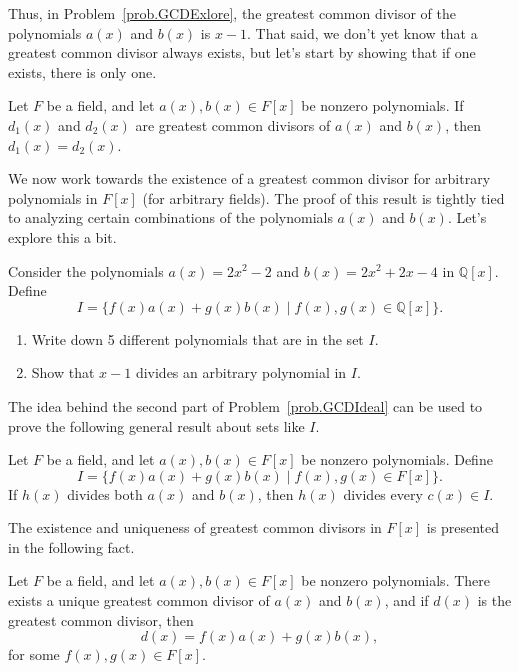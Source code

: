 Thus, in Problem~\ref{prob.GCDExlore},  the greatest common divisor of the polynomials $a(x)$ and $b(x)$ is $x-1$.
That said, we don't yet know that a greatest common divisor always exists, but let's start by showing that if one exists, there is only one.

\begin{lemma}\label{lem.GCDUnique}
Let $F$ be a field, and let $a(x), b(x)\in F[x]$ be nonzero polynomials. If $d_1(x)$ and $d_2(x)$ are  greatest common divisors of $a(x)$ and $b(x)$, then $d_1(x)=d_2(x)$.
\end{lemma}

We now work towards the existence of a greatest common divisor for arbitrary polynomials in $F[x]$ (for arbitrary fields). The proof of this result is tightly tied to analyzing certain combinations of the polynomials $a(x)$ and $b(x)$. Let's explore this a bit.

\begin{problem}\label{prob.GCDIdeal}
Consider the polynomials $a(x) = 2x^2-2$ and $b(x) = 2x^2+2x-4$ in $\mathbb{Q}[x]$.  Define \[I = \{f(x)a(x) + g(x)b(x)\mid f(x),g(x)\in \mathbb{Q}[x]\}.\]
\begin{enumerate}
\item Write down 5 different polynomials that are in the set $I$. 
\item Show that $x-1$ divides an arbitrary polynomial in $I$.
\end{enumerate}
\end{problem}

The idea behind the second part of Problem~\ref{prob.GCDIdeal} can be used to prove the following general result about sets like $I$.

\begin{theorem}\label{thm.HalfOfGCDProof}
Let $F$ be a field, and let $a(x), b(x)\in F[x]$ be nonzero polynomials. Define \[I = \{f(x)a(x) + g(x)b(x)\mid f(x),g(x)\in F[x]\}.\]
If $h(x)$ divides both $a(x)$ and $b(x)$, then $h(x)$ divides every $c(x)\in I$.
\end{theorem}

The existence and uniqueness of greatest common divisors in $F[x]$ is presented in the following fact.

\begin{fact}\label{fact.GCD}
Let $F$ be a field, and let $a(x), b(x)\in F[x]$ be nonzero polynomials. There exists a unique greatest common divisor of $a(x)$ and $b(x)$, and if $d(x)$ is the greatest common divisor, then \[d(x) = f(x)a(x) + g(x)b(x),\]
for some $f(x),g(x)\in F[x]$.
\end{fact}

